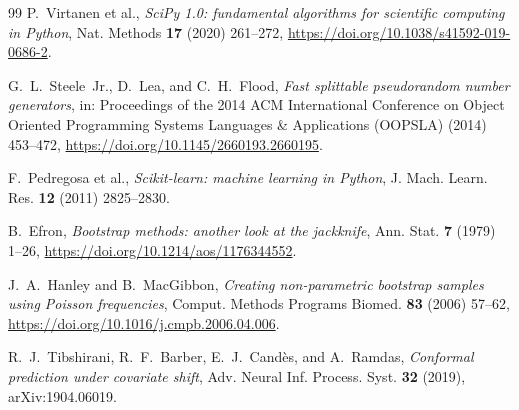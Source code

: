 \documentclass[pdflatex,sn-mathphys,Numbered,iicol]{sn-jnl}
\begin{document}
\begin{thebibliography}{99}
P.~Virtanen et al.,
\emph{SciPy 1.0: fundamental algorithms for scientific computing in Python},
Nat. Methods \textbf{17} (2020) 261--272,
\url{https://doi.org/10.1038/s41592-019-0686-2}.

G.~L.~Steele~Jr., D.~Lea, and C.~H.~Flood,
\emph{Fast splittable pseudorandom number generators},
in: Proceedings of the 2014 ACM International Conference on Object Oriented
Programming Systems Languages \& Applications (OOPSLA) (2014) 453--472,
\url{https://doi.org/10.1145/2660193.2660195}.

F.~Pedregosa et al.,
\emph{Scikit-learn: machine learning in Python},
J. Mach. Learn. Res. \textbf{12} (2011) 2825--2830.

B.~Efron,
\emph{Bootstrap methods: another look at the jackknife},
Ann. Stat. \textbf{7} (1979) 1--26,
\url{https://doi.org/10.1214/aos/1176344552}.

J.~A.~Hanley and B.~MacGibbon,
\emph{Creating non-parametric bootstrap samples using Poisson frequencies},
Comput. Methods Programs Biomed. \textbf{83} (2006) 57--62,
\url{https://doi.org/10.1016/j.cmpb.2006.04.006}.

R.~J.~Tibshirani, R.~F.~Barber, E.~J.~Cand\`{e}s, and A.~Ramdas,
\emph{Conformal prediction under covariate shift},
Adv. Neural Inf. Process. Syst. \textbf{32} (2019),
arXiv:1904.06019.

\end{thebibliography}
\end{document}
